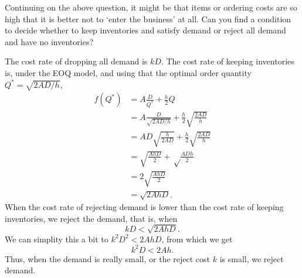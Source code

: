\begin{question}
  Continuing on the above question, it might be that items or ordering
  costs are so high that it is better not to `enter the business' at
  all. Can you find a condition to decide whether to keep inventories
  and satisfy demand or reject all demand and have no inventories?
  \begin{solution}
    The cost rate of dropping all demand is $kD$. The cost rate of keeping inventories is, under the EOQ model,  and using that the optimal order quantity $Q^* = \sqrt{2AD/h}$, 
    \begin{equation*}
      \begin{split}
      f(Q^*)
 &= A \frac{D}{Q^*} + \frac h 2 Q \\
 &= A \frac{D}{\sqrt{2AD/h}} + \frac h 2 \sqrt{\frac{2AD}h} \\
 &= A D \sqrt{\frac{h} {2AD}} + \frac h 2 \sqrt{\frac{2AD}h} \\
 &=  \sqrt{\frac {AhD}{2}} + \sqrt\frac{ADh}2 \\
 &=  2\sqrt{\frac {AhD}{2}} \\
 &=  \sqrt{2AhD}.
      \end{split}
    \end{equation*}
When the cost rate of rejecting demand is lower than the cost rate of keeping inventories, we reject the demand, that is, when
\begin{equation*}
kD < \sqrt{2AhD}.
\end{equation*}
We can simplity this a bit to $k^2D^2 < 2AhD$, from which we get
\begin{equation*}
  k^2 D < 2 A h.
\end{equation*}
Thus, when the demand is really small, or the reject cost $k$ is
small, we reject demand. 
  \end{solution}
\end{question}


